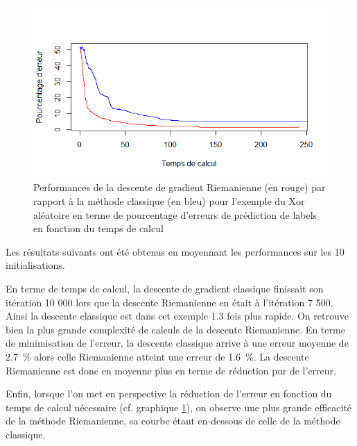 \documentclass{article}
\theoremstyle{definition}
\begin{document}
\begin{figure}[!ht]\centering
\includegraphics[scale=0.5]{XorPerf.png}
\caption{Performances de la descente de gradient Riemanienne (en rouge) par rapport à la méthode classique (en bleu) pour l'exemple du Xor aléatoire en terme de pourcentage d'erreurs de prédiction de labels en fonction du temps de calcul}
\label{fig:xorgrad}%
\end{figure}
Les résultats suivants ont été obtenus en moyennant les performances sur les 10 initialisations.

En terme de temps de calcul, la descente de gradient classique finissait son itération 10 000 lors que la descente Riemanienne en était à l'itération 7 500. Ainsi la descente classique est dans cet exemple 1.3 fois plus rapide. On retrouve bien la plus grande complexité de calculs de la descente Riemanienne.
En terme de minimisation de l'erreur, la descente classique arrive à une erreur moyenne de 2.7~\% alors celle Riemanienne atteint une erreur de 1.6~\%. La descente Riemanienne est donc en moyenne plus en terme de réduction pur de l'erreur.

Enfin, lorsque l'on met en perspective la réduction de l'erreur en fonction du temps de calcul nécessaire (cf. graphique \ref{fig:xorgrad}), on observe une plus grande efficacité de la méthode Riemanienne, sa courbe étant en-dessous de celle de la méthode classique.

\end{document}
